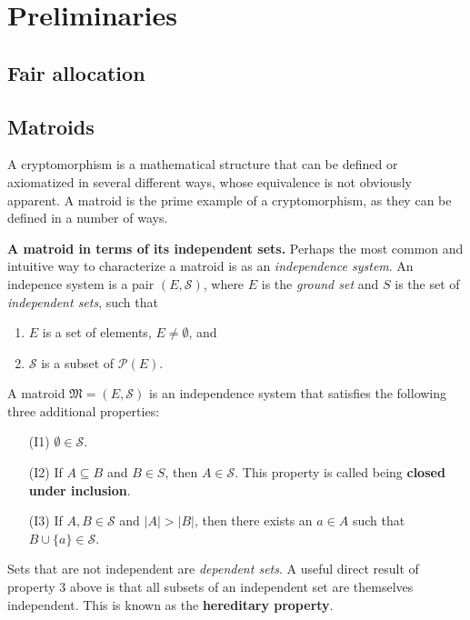 \section{Preliminaries}

\subsection*{Fair allocation}
\skelpars[12]

\subsection*{Matroids}
A cryptomorphism is a mathematical structure that can be defined or axiomatized in several different ways, whose equivalence is not obviously apparent. A matroid is the prime example of a cryptomorphism, as they can be defined in a number of ways.



\textbf{A matroid in terms of its independent sets.} Perhaps the most common and intuitive way to characterize a matroid is as an \textit{independence system}. An indepence system is a pair $(E,\mathcal{S})$, where $E$ is the \textit{ground set} and $S$ is the set of \textit{independent sets}, such that

\begin{enumerate}[align=left]
  \item $E$ is a set of elements, $E \not = \emptyset$, and
  \item $\mathcal{S}$ is a subset of $\mathcal{P}(E)$.
\end{enumerate}

A matroid $\mathfrak{M} = (E, \mathcal{S})$ is an independence system that satisfies the following three additional properties:

\begin{enumerate}[align=left]
  \item [(I1)] $\emptyset \in \mathcal{S}$.
  \item [(I2)] If $A \subseteq B$ and $B \in S$, then $A \in \mathcal{S}$. This property is called being \textbf{closed under inclusion}.
  \item [(I3)] If $A,B \in \mathcal{S}$ and $|A| > |B|$, then there exists an $a \in A$ such that $B \cup \{a\} \in \mathcal{S}$.
\end{enumerate}

Sets that are not independent are \textit{dependent sets}. A useful direct result of property 3 above is that all subsets of an independent set are themselves independent. This is known as the \textbf{hereditary property}.



